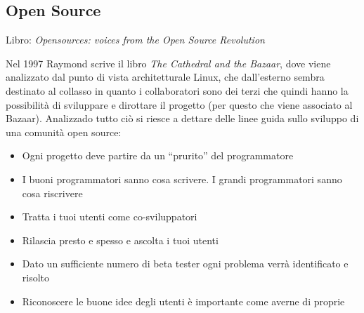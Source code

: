 \subsection{Open Source}

Libro: \textit{Opensources: voices from the Open Source Revolution}

Nel 1997 Raymond scrive il libro \textit{The Cathedral and the Bazaar}, dove viene analizzato dal punto di vista architetturale Linux, che dall'esterno sembra destinato al collasso in quanto i collaboratori sono dei terzi che quindi hanno la possibilit\`a di sviluppare e dirottare il progetto (per questo che viene associato al Bazaar). Analizzado tutto ci\`o si riesce a dettare delle linee guida sullo sviluppo di una comunit\`a open source:
\begin{itemize}

\item Ogni progetto deve partire da un ``prurito'' del programmatore
\item I buoni programmatori sanno cosa scrivere. I grandi programmatori sanno cosa riscrivere
\item Tratta i tuoi utenti come co-sviluppatori
\item Rilascia presto e spesso e ascolta i tuoi utenti
\item Dato un sufficiente numero di beta tester ogni problema verr\`a identificato e risolto
\item Riconoscere le buone idee degli utenti \`e importante come averne di proprie

\end{itemize}

